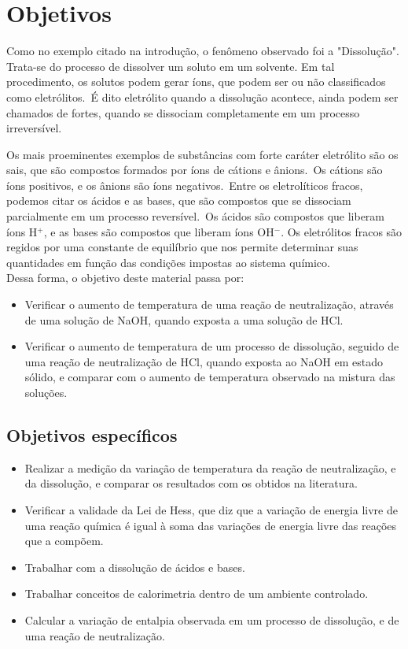 \section{Objetivos}\label{sec:objetivos}

\indent Como no exemplo citado na introdução, o fenômeno observado foi a "Dissolução". Trata-se do processo de dissolver um soluto em um solvente. Em tal procedimento, os solutos podem gerar íons,
que podem ser ou não classificados como eletrólitos.\ É dito eletrólito quando a dissolução acontece, ainda podem ser chamados de fortes, quando se dissociam completamente em um processo
irreversível.

\indent Os mais proeminentes exemplos de substâncias com forte caráter eletrólito são os sais, que são compostos formados por íons de cátions e ânions.\ Os cátions são íons positivos, e os ânions são íons negativos.\
Entre os eletrolíticos fracos, podemos citar os ácidos e as bases, que são compostos que se dissociam parcialmente em um processo reversível.\ Os ácidos são compostos que liberam íons H$^+$,
e as bases são compostos que liberam íons OH$^-$. Os eletrólitos fracos são regidos por uma constante de equilíbrio que nos permite determinar suas quantidades em função das condições impostas ao sistema químico.\\

\indent Dessa forma, o objetivo deste material passa por:

\begin{itemize}
        \item Verificar o aumento de temperatura de uma reação de neutralização, através de uma solução de NaOH, quando exposta a uma solução de HCl.
        \item Verificar o aumento de temperatura de um processo de dissolução, seguido de uma reação de neutralização de HCl, quando exposta ao NaOH em estado sólido, e comparar com o aumento de temperatura observado na mistura das soluções.
    \end{itemize}
    \subsection{Objetivos específicos}\label{sec:objetivos_especificos}
    \begin{itemize}
        \item Realizar a medição da variação de temperatura da reação de neutralização, e da dissolução, e comparar os resultados com os obtidos na literatura.
        \item Verificar a validade da Lei de Hess, que diz que a variação de energia livre de uma reação química é igual à soma das variações de energia livre das reações que a compõem.
        \item Trabalhar com a dissolução de ácidos e bases.
        \item Trabalhar conceitos de calorimetria dentro de um ambiente controlado.
        \item Calcular a variação de entalpia observada em um processo de dissolução, e de uma reação de neutralização.
    \end{itemize}\\
